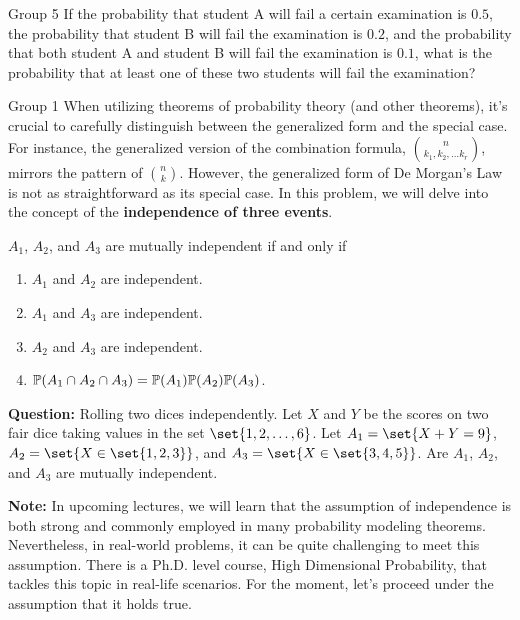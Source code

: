 \documentclass{article}
\begin{document}
\begin{problem}
    {Group 5}
    If the probability that student A will fail a certain examination is $0.5$, the probability that student B will fail the examination is $0.2$, and the probability that both student A and student B will fail the examination is $0.1$, what is the probability that at least one of these two students will fail the examination?
\end{problem}
\fi
\iffalse
\begin{problem}
    {Group 1}
    When utilizing theorems of probability theory (and other theorems), it's crucial to carefully distinguish between the generalized form and the special case. For instance, the generalized version of the combination formula, $\binom{n}{k_1,k_2,\ldots k_r}$, mirrors the pattern of $\binom{n}{k}$. However, the generalized form of De Morgan's Law is not as straightforward as its special case. In this problem, we will delve into the concept of the \textbf{independence of three events}.
    \begin{definition}
        $A_1$, $A_2$, and $A_3$ are mutually independent if and only if
        \begin{enumerate}
            \item $A_1$ and $A_2$ are independent.
            \item $A_1$ and $A_3$ are independent.
            \item $A_2$ and $A_3$ are independent.
            \item $\P{A_1\cap A_2\cap A_3}=\P{A_1}\P{A_2}\P{A_3}$.
        \end{enumerate}
    \end{definition}
    \textbf{Question:} Rolling two dices independently. Let $X$ and $Y$ be the scores on two fair dice taking values in the set $\set{1,2,\ldots,6}$. Let $A_1 = \set{X+Y=9}$, $A_2=\set{X\in \set{1,2,3}}$, and $A_3=\set{X\in\set{3,4,5}}$. Are $A_1$, $A_2$, and $A_3$ are mutually independent.

    \textbf{Note:} In upcoming lectures, we will learn that the assumption of independence is both strong and commonly employed in many probability modeling theorems. Nevertheless, in real-world problems, it can be quite challenging to meet this assumption. There is a Ph.D. level course, High Dimensional Probability, that tackles this topic in real-life scenarios. For the moment, let's proceed under the assumption that it holds true.
\end{problem}
\end{document}

